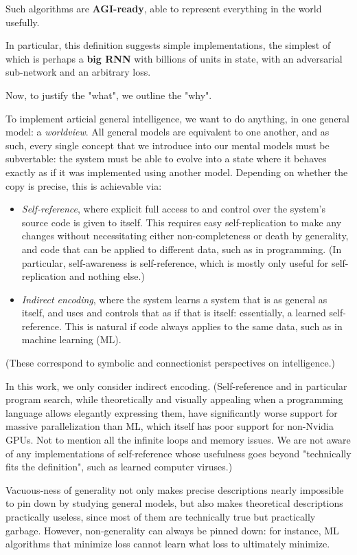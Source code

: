 \documentclass{article}
\begin{document}
Such algorithms are \textbf{AGI-ready}, able to represent everything in the world usefully.

In particular, this definition suggests simple implementations, the simplest of which is perhaps a \textbf{big RNN} with billions of units in state, with an adversarial sub-network and an arbitrary loss.

Now, to justify the "what", we outline the "why".

To implement articial general intelligence, we want to do anything, in one general model: a \textit{worldview}. All general models are equivalent to one another, and as such, every single concept that we introduce into our mental models must be subvertable: the system must be able to evolve into a state where it behaves exactly as if it was implemented using another model. Depending on whether the copy is precise, this is achievable via:

\begin{itemize}
\item \textit{Self-reference}, where explicit full access to and control over the system's source code is given to itself. This requires easy self-replication to make any changes without necessitating either non-completeness or death by generality, and code that can be applied to different data, such as in programming. (In particular, self-awareness is self-reference, which is mostly only useful for self-replication and nothing else.)
\item \textit{Indirect encoding}, where the system learns a system that is as general as itself, and uses and controls that as if that is itself: essentially, a learned self-reference. This is natural if code always applies to the same data, such as in machine learning (ML).
\end{itemize}

(These correspond to symbolic and connectionist perspectives on intelligence.)

In this work, we only consider indirect encoding. (Self-reference and in particular program search, while theoretically and visually appealing when a programming language allows elegantly expressing them, have significantly worse support for massive parallelization than ML, which itself has poor support for non-Nvidia GPUs. Not to mention all the infinite loops and memory issues. We are not aware of any implementations of self-reference whose usefulness goes beyond "technically fits the definition", such as learned computer viruses.)

Vacuous-ness of generality not only makes precise descriptions nearly impossible to pin down by studying general models, but also makes theoretical descriptions practically useless, since most of them are technically true but practically garbage. However, non-generality can always be pinned down: for instance, ML algorithms that minimize loss cannot learn what loss to ultimately minimize.
\end{document}
